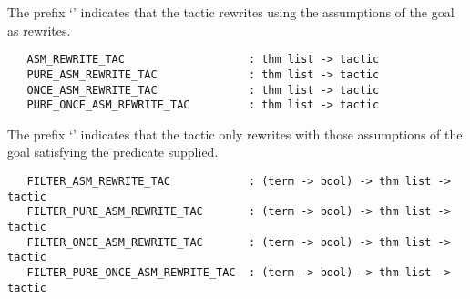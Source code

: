 \noindent The prefix `'
indicates that the tactic rewrites using the assumptions
of the goal as rewrites.

\begin{hol}
\begin{verbatim}
   ASM_REWRITE_TAC                   : thm list -> tactic
   PURE_ASM_REWRITE_TAC              : thm list -> tactic
   ONCE_ASM_REWRITE_TAC              : thm list -> tactic
   PURE_ONCE_ASM_REWRITE_TAC         : thm list -> tactic
\end{verbatim}\end{hol}

\noindent The prefix `'
indicates that the tactic only rewrites with
those assumptions of the goal satisfying the predicate supplied.

\begin{hol}\begin{verbatim}
   FILTER_ASM_REWRITE_TAC            : (term -> bool) -> thm list -> tactic
   FILTER_PURE_ASM_REWRITE_TAC       : (term -> bool) -> thm list -> tactic
   FILTER_ONCE_ASM_REWRITE_TAC       : (term -> bool) -> thm list -> tactic
   FILTER_PURE_ONCE_ASM_REWRITE_TAC  : (term -> bool) -> thm list -> tactic
\end{verbatim}\end{hol}

